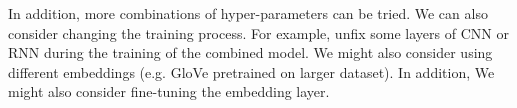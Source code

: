 \documentclass[12pt]{article} %
\begin{document}
In addition, more combinations of hyper-parameters can be tried. We can also consider changing the training process. For example, unfix some layers of CNN or RNN during the training of the combined model. We might also consider using different embeddings (e.g. GloVe pretrained on larger dataset). In addition, We might also consider fine-tuning the embedding layer.


\end{document}
